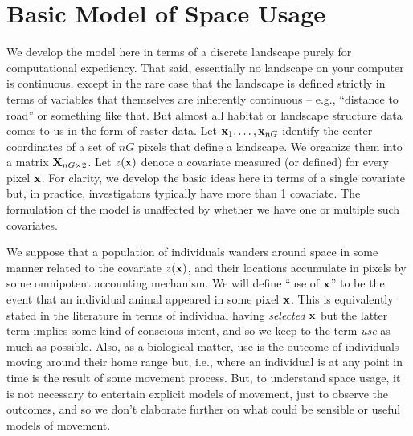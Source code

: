 \section{Basic Model of Space Usage}
\label{rsf.sec.rsfmodel}

We develop the model here in terms of a discrete landscape purely for
computational expediency. That said, essentially no landscape on your
computer is continuous, except in the rare case that the landscape is
defined strictly in terms of variables that themselves are inherently
continuous -- e.g., ``distance to road'' or something like that.  But
almost all habitat or landscape structure data comes to us in the form
of raster data.  Let ${\bf x}_{1},\ldots,{\bf x}_{nG}$ identify the center
coordinates of a set of $nG$ pixels that define a landscape.
We organize them into a matrix
${\bf X}_{nG \times 2}$.  Let $z({\bf x})$ denote a covariate measured
(or defined) for
every pixel ${\bf x}$. For clarity, we develop the basic ideas here in terms of a
single covariate but, in practice, investigators typically have more
than 1 covariate. The formulation of the model is unaffected by
whether we have one or multiple such covariates.

We suppose that a population of individuals wanders around space in
some manner related to the covariate $z({\bf x})$, and their locations
accumulate in pixels by some omnipotent accounting mechanism. We will
define ``use of ${\bf x}$'' to be the event that an individual animal
appeared in some pixel ${\bf x}$. This is equivalently stated in the
literature in terms of individual having {\it selected} ${\bf x}$ but
the latter term implies some kind of 
conscious intent, and so we keep to the term {\it use} as much as
possible.  Also, as a biological matter, use is the outcome of
individuals moving around their home range but, i.e., where an
individual is at any point in time is the result of some movement
process. But, to understand space usage, it is not necessary to
entertain explicit models of movement, just to observe the outcomes,
and so we don't elaborate further on what could be sensible or useful
models of movement.

